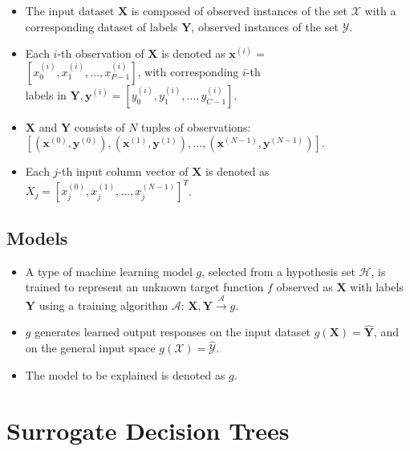 \documentclass{article}
\begin{document}
	\begin{itemize}
		\item The input dataset $\mathbf{X}$ is composed of observed instances of the set $\mathcal{X}$ with a corresponding dataset of labels $\mathbf{Y}$, observed instances of the set $\mathcal{Y}$.
		\item Each $i$-th observation of $\mathbf{X}$ is denoted as $\mathbf{x}^{(i)} = $ \\ 
		$[x_0^{(i)}, x_1^{(i)}, \dots, x_{\textit{P}-1}^{(i)}]$, with corresponding $i$-th \\ labels in $\mathbf{Y}, \mathbf{y}^{(i)} = [y_0^{(i)}, y_1^{(i)}, \dots, y_{\textit{C}-1}^{(i)}]$.
		\item $\mathbf{X}$ and $\mathbf{Y}$ consists of $N$ tuples of observations:\\ $[(\mathbf{x}^{(0)},\mathbf{y}^{(0)}), (\mathbf{x}^{(1)},\mathbf{y}^{(1)}), \dots, (\mathbf{x}^{(N-1)},\mathbf{y}^{(N-1)})]$. %
		\item Each $j$-th input column vector of $\mathbf{X}$ is denoted as $X_j = [x_{j}^{(0)}, x_{j}^{(1)}, \dots, x_{j}^{(N-1)}]^T$.
	\end{itemize}	 

\subsection{Models}

	\begin{itemize}
		\item A type of machine learning model $g$, selected from a hypothesis set $\mathcal{H}$, is trained to represent an unknown target function $f$ observed as  $\mathbf{X}$ with labels $\mathbf{Y}$ using a training algorithm $\mathcal{A}$: 
		$ \mathbf{X}, \mathbf{Y} \xrightarrow{\mathcal{A}} g$.
		\item $g$ generates learned output responses on the input dataset $g(\mathbf{X}) = \mathbf{\hat{Y}}$, and on the general input space $g(\mathcal{X}) = \mathcal{\hat{Y}}$.
		\item The model to be explained is denoted as $g$.
	\end{itemize}

\section{Surrogate Decision Trees} \label{sec:surrogate_dt}
\end{document}
